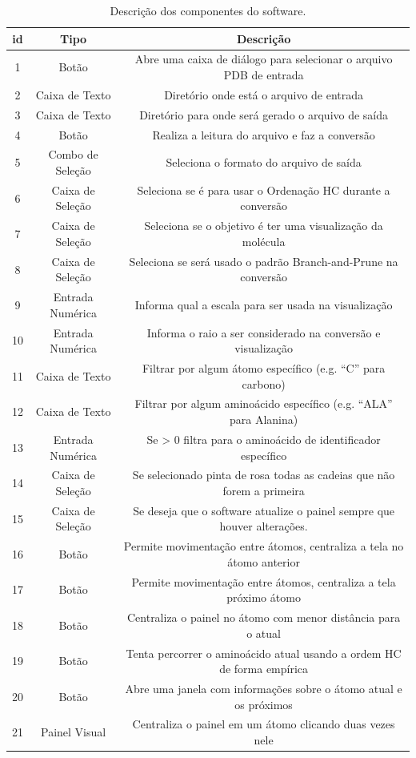 \begin{table}[H]
	\hspace{-2cm}
	\begin{tabular}{ |c|c|c| } 
		\hline
		\textbf{id} & \textbf{Tipo} & \textbf{Descrição} \\
		\hline
		1 & Botão & Abre uma caixa de diálogo para selecionar o arquivo PDB de entrada \\\hline
		2 & Caixa de Texto & Diretório onde está o arquivo de entrada \\ \hline
		3 & Caixa de Texto & Diretório para onde será gerado o arquivo de saída\\\hline
		4 & Botão & Realiza a leitura do arquivo e faz a conversão\\\hline
		5 & Combo de Seleção & Seleciona o formato do arquivo de saída \\\hline
		6 & Caixa de Seleção & Seleciona se é para usar o Ordenação HC durante a conversão \\ \hline
		7 & Caixa de Seleção & Seleciona se o objetivo é ter uma visualização da molécula\\ \hline
		8 & Caixa de Seleção & Seleciona se será usado o padrão Branch-and-Prune na conversão\\ \hline
		9 & Entrada Numérica & Informa qual a escala para ser usada na visualização\\ \hline
		10 & Entrada Numérica & Informa o raio a ser considerado na conversão e visualização\\ \hline
		11 & Caixa de Texto & Filtrar por algum átomo específico (e.g. ``C'' para carbono)\\ \hline
		12 & Caixa de Texto & Filtrar por algum aminoácido específico (e.g. ``ALA'' para Alanina)\\ \hline
		13 & Entrada Numérica & Se > 0 filtra para o aminoácido de identificador específico\\ \hline
		14 & Caixa de Seleção & Se selecionado pinta de rosa todas as cadeias que não forem a primeira\\ \hline
		15 & Caixa de Seleção & Se deseja que o software atualize o painel sempre que houver alterações.\\ \hline
		16 & Botão & Permite movimentação entre átomos, centraliza a tela no átomo anterior\\ \hline
		17 & Botão & Permite movimentação entre átomos, centraliza a tela próximo átomo\\ \hline
		18 & Botão & Centraliza o painel no átomo com menor distância para o atual\\ \hline
		19 & Botão & Tenta percorrer o aminoácido atual usando a ordem HC de forma empírica\\ \hline
		20 & Botão & Abre uma janela com informações sobre o átomo atual e os próximos\\ \hline
		21 & Painel Visual & Centraliza o painel em um átomo clicando duas vezes nele\\\hline
	\end{tabular}
	\caption{Descrição dos componentes do software.}
	\label{table:HCProt}
\end{table}

